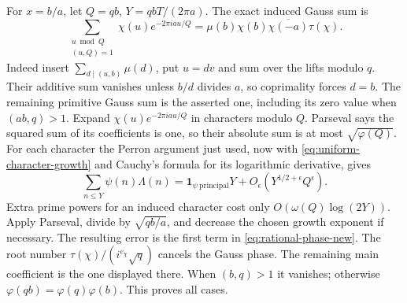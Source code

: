 For $x=b/a$, let $Q=qb$, $Y=qbT/(2\pi a)$. The exact induced Gauss
sum is
\[
 \sum_{\substack{u\bmod Q\\(u,Q)=1}}\chi(u)e^{-2\pi iau/Q}
       =\mu(b)\chi(b)\overline{\chi(-a)}\tau(\chi).
\]
Indeed insert $\sum_{d\mid(u,b)}\mu(d)$, put $u=dv$ and sum over
the lifts modulo $q$. Their additive sum vanishes unless $b/d$ divides
$a$, so coprimality forces $d=b$. The remaining primitive Gauss sum
is the asserted one, including its zero value when $(ab,q)>1$.
Expand $\chi(u)e^{-2\pi iau/Q}$ in characters modulo $Q$.
Parseval says the squared sum of its coefficients is one, so their
absolute sum is at most $\sqrt{\varphi(Q)}$. For each character the
Perron argument just used, now with
\eqref{eq:uniform-character-growth} and Cauchy's formula for its
logarithmic derivative, gives
\[
 \sum_{n\le Y}\psi(n)\Lambda(n)
   =\mathbf1_{\psi\ {\mathrm{principal}}}Y
          +O_\epsilon(Y^{1/2+\epsilon}Q^\epsilon).
\]
Extra prime powers for an induced character cost only
$O(\omega(Q)\log(2Y))$. Apply Parseval, divide by $\sqrt{qb/a}$,
and decrease the chosen growth exponent if necessary. The resulting
error is the first term in \eqref{eq:rational-phase-new}.
The root number $\tau(\chi)/(i^{e_\chi}\sqrt q)$ cancels the Gauss
phase. The remaining main coefficient is the one displayed there.
When $(b,q)>1$ it vanishes; otherwise
$\varphi(qb)=\varphi(q)\varphi(b)$. This proves all cases.

